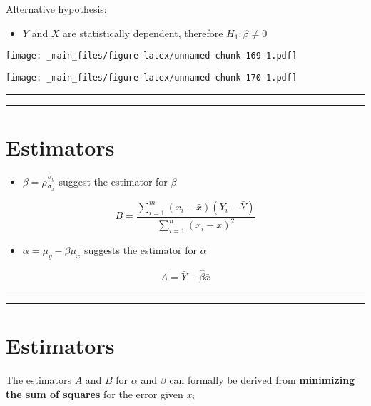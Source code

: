 \documentclass[
]{book}
\providecommand{\tightlist}{%
  \setlength{\itemsep}{0pt}\setlength{\parskip}{0pt}}
\begin{document}
Alternative hypothesis:

\begin{itemize}
\tightlist
\item
  \(Y\) and \(X\) are statistically dependent, therefore \(H_1: \beta\neq 0\)
\end{itemize}

\texttt{[image: \_main\_files/figure-latex/unnamed-chunk-169-1.pdf]}

\texttt{[image: \_main\_files/figure-latex/unnamed-chunk-170-1.pdf]}

\begin{center}\rule{0.5\linewidth}{0.5pt}\end{center}

\begin{center}\rule{0.5\linewidth}{0.5pt}\end{center}

\hypertarget{estimators-1}{%
\section{Estimators}\label{estimators-1}}

\begin{itemize}
\tightlist
\item
  \(\beta=\rho\frac{\sigma_y}{\sigma_x}\) suggest the estimator for \(\beta\)
\end{itemize}

\[B=\frac{\sum_{i=1}^m(x_i-\bar{x})(Y_i-\bar{Y})}{\sum_{i=1}^n(x_i-\bar{x})^2}\]

\begin{itemize}
\tightlist
\item
  \(\alpha=\mu_y-\beta\mu_x\) suggests the estimator for \(\alpha\)
\end{itemize}

\[A=\bar{Y}- \hat{\beta}\bar{x}\]

\begin{center}\rule{0.5\linewidth}{0.5pt}\end{center}

\begin{center}\rule{0.5\linewidth}{0.5pt}\end{center}

\hypertarget{estimators-2}{%
\section{Estimators}\label{estimators-2}}

The estimators \(A\) and \(B\) for \(\alpha\) and \(\beta\) can formally be derived from \textbf{minimizing the sum of squares} for the error given \(x_i\)
\end{document}

